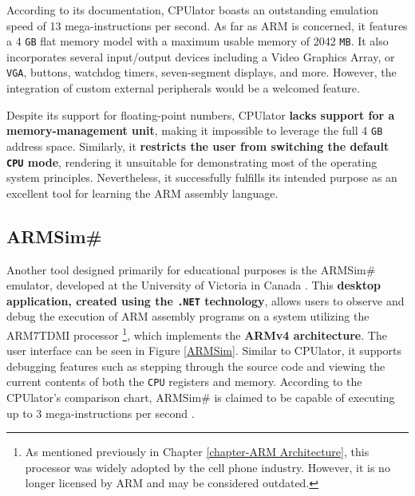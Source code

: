 \documentclass[english, ing, kiv, he, iso690numb, pdf]{fasthesis}
\begin{document}
	According to its documentation, CPUlator boasts an outstanding emulation speed of 13 mega-instructions per second. As far as ARM is concerned, it features a 4 \texttt{GB} flat memory model with a maximum usable memory of 2042 \texttt{MB}. It also incorporates several input/output devices including a Video Graphics Array, or \texttt{VGA}, buttons, watchdog timers, seven-segment displays, and more. However, the integration of custom external peripherals would be a welcomed feature.
	
	Despite its support for floating-point numbers, CPUlator \textbf{lacks support for a memory-management unit}, making it impossible to leverage the full 4 \texttt{GB} address space. Similarly, it \textbf{restricts the user from switching the default \texttt{CPU} mode}, rendering it unsuitable for demonstrating most of the operating system principles. Nevertheless, it successfully fulfills its intended purpose as an excellent tool for learning the ARM assembly language.
	
	\subsection{ARMSim\#}
	
	Another tool designed primarily for educational purposes is the ARMSim\# emulator, developed at the University of Victoria in Canada \cite{ARMSim}. This \textbf{desktop application, created using the \texttt{.NET} technology}, allows users to observe and debug the execution of ARM assembly programs on a system utilizing the ARM7TDMI \break processor \footnote{As mentioned previously in Chapter \ref{chapter-ARM Architecture}, this processor was widely adopted by the cell phone industry. However, it is no longer licensed by ARM and may be considered outdated.}, which implements the \textbf{ARMv4 architecture}. The user interface can be seen in Figure \ref{ARMSim}. Similar to CPUlator, it supports debugging features such as stepping through the source code and viewing the current contents of both the \texttt{CPU} registers and memory. According to the CPUlator's comparison chart, ARMSim\# is claimed to be capable of executing up to 3 mega-instructions per second \cite{CPUlator}.
	
\end{document}
